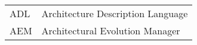 
\setlength\tabcolsep{0.5cm}
\flushleft
\begin{tabular}{l l}
ADL				& Architecture Description Language \\
AEM				& Architectural Evolution Manager \\
\end{tabular}

\cleardoublepage